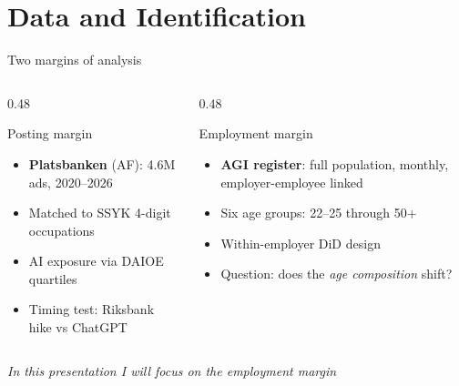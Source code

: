\documentclass[aspectratio=169,11pt]{beamer}
\begin{document}
\section{Data and Identification}

\begin{frame}{Two margins of analysis}
\begin{columns}[T]
\begin{column}{0.48\textwidth}
\begin{block}{Posting margin}
\begin{itemize}
    \item \textbf{Platsbanken} (AF): 4.6M ads, 2020--2026
    \item Matched to SSYK 4-digit occupations
    \item AI exposure via DAIOE quartiles
    \item Timing test: Riksbank hike vs ChatGPT
\end{itemize}
\end{block}
\end{column}
\begin{column}{0.48\textwidth}
\begin{block}{Employment margin}
\begin{itemize}
    \item \textbf{AGI register}: full population, monthly, employer-employee linked
    \item Six age groups: 22--25 through 50+
    \item Within-employer DiD design
    \item Question: does the \textit{age composition} shift?
\end{itemize}
\end{block}
\end{column}
\end{columns}
\vspace{5mm}
\begin{center}
\textit{In this presentation I will focus on the employment margin}
\end{center}
\end{frame}
\end{document}
